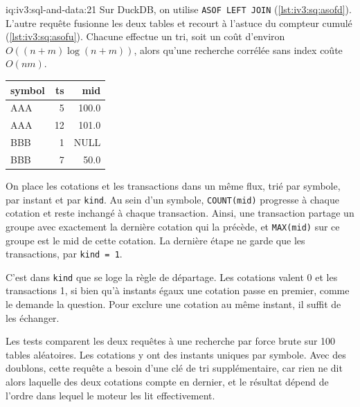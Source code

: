 \begin{solution}{iq:iv3:sql-and-data:21}
Sur DuckDB, on utilise \texttt{ASOF LEFT JOIN} (\cref{lst:iv3:sq:asofd}). L'autre requête fusionne les deux tables et recourt à l'astuce du compteur cumulé (\cref{lst:iv3:sq:asofu}). Chacune effectue un tri, soit un coût d'environ $O((n + m) \log(n + m))$, alors qu'une recherche corrélée sans index coûte $O(nm)$.
\label{lst:iv3:sq:asofd}
\label{lst:iv3:sq:asofu}
\begin{center}\small
\begin{tabular}{lrr}
symbol & ts & mid\\\hline
AAA & 5 & 100.0\\
AAA & 12 & 101.0\\
BBB & 1 & NULL\\
BBB & 7 & 50.0
\end{tabular}
\end{center}
On place les cotations et les transactions dans un même flux, trié par symbole, par instant et par \texttt{kind}. Au sein d'un symbole, \texttt{COUNT(mid)} progresse à chaque cotation et reste inchangé à chaque transaction. Ainsi, une transaction partage un groupe avec exactement la dernière cotation qui la précède, et \texttt{MAX(mid)} sur ce groupe est le mid de cette cotation. La dernière étape ne garde que les transactions, par \texttt{kind = 1}.

C'est dans \texttt{kind} que se loge la règle de départage. Les cotations valent 0 et les transactions 1, si bien qu'à instants égaux une cotation passe en premier, comme le demande la question. Pour exclure une cotation au même instant, il suffit de les échanger.

Les tests comparent les deux requêtes à une recherche par force brute sur 100 tables aléatoires. Les cotations y ont des instants uniques par symbole. Avec des doublons, cette requête a besoin d'une clé de tri supplémentaire, car rien ne dit alors laquelle des deux cotations compte en dernier, et le résultat dépend de l'ordre dans lequel le moteur les lit effectivement.

\end{solution}

